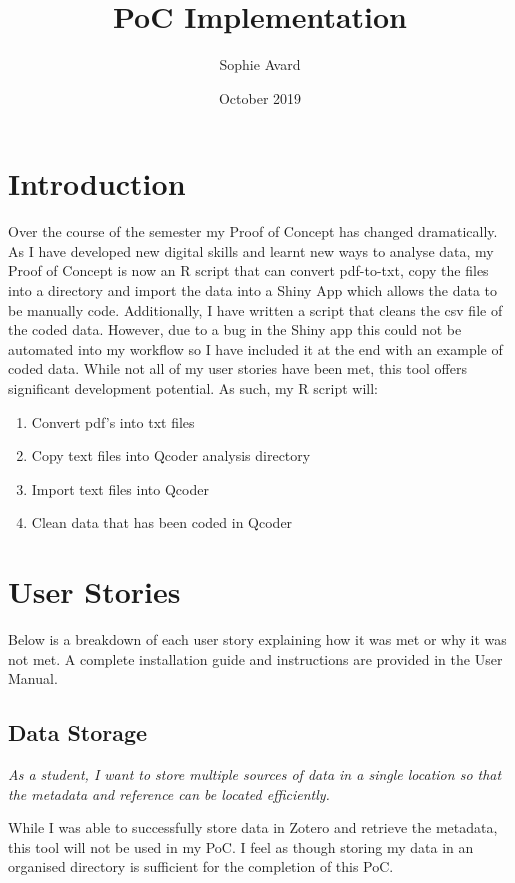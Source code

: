 \documentclass{article}
\title{PoC Implementation}
\author{Sophie Avard }
\date{October 2019}
\begin{document}
\maketitle

\section{Introduction}
Over the course of the semester my Proof of Concept has changed dramatically. As I have developed new digital skills and learnt new ways to analyse data, my Proof of Concept is now an R script that can convert pdf-to-txt, copy the files into a directory and import the data into a Shiny App which allows the data to be manually code. Additionally, I have written a script that cleans the csv file of the coded data. However, due to a bug in the Shiny app this could not be automated into my workflow so I have included it at the end with an example of coded data. While not all of my user stories have been met, this tool offers significant development potential. As such, my R script will:
\begin{enumerate}
    \item Convert pdf's into txt files
    \item Copy text files into Qcoder analysis directory 
    \item Import text files into Qcoder 
    \item Clean data that has been coded in Qcoder
\end{enumerate}

\section{User Stories}
Below is a breakdown of each user story explaining how it was met or why it was not met. A complete installation guide and instructions are provided in the User Manual. 

\subsection{Data Storage}
\begin{center}\textit{As a student, I want to store multiple sources of data in a single location so that the metadata and reference can be located efficiently.}
\end{center}
While I was able to successfully store data in Zotero and retrieve the metadata, this tool will not be used in my PoC. I feel as though storing my data in an organised directory is sufficient for the completion of this PoC. 
\end{document}
